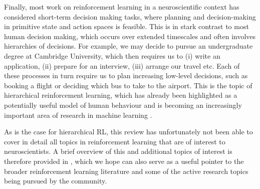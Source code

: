 Finally, most work on reinforcement learning in a neuroscientific context has considered short-term decision making tasks, where planning and decision-making in primitive state and action spaces is feasible.
This is in stark contrast to most human decision making, which occurs over extended timescales and often involves hierarchies of decisions.
For example, we may decide to pursue an undergraduate degree at Cambridge University, which then requires us to (i) write an application, (ii) prepare for an interview, (iii) arrange our travel etc.
Each of these processes in turn require us to plan increasing low-level decisions, such as booking a flight or deciding which bus to take to the airport.
This is the topic of hierarchical reinforcement learning, which has already been highlighted as a potentially useful model of human behaviour \citep{eckstein2020computational} and is becoming an increasingly important area of research in machine learning \citep{pateria2021hierarchical}.

As is the case for hierarchical RL, this review has unfortunately not been able to cover in detail all topics in reinforcement learning that are of interest to neuroscientists.
A brief overview of this and additional topics of interest is therefore provided in , which we hope can also serve as a useful pointer to the broader reinforcement learning literature and some of the active research topics being pursued by the community.
